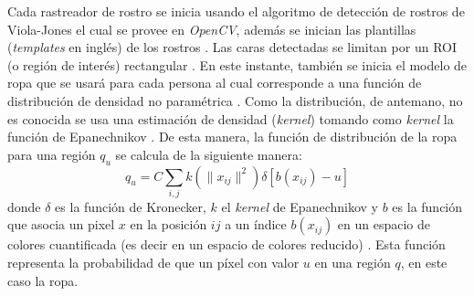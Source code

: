 \documentclass[a4paper,openright,12pt]{report}
\begin{document}
Cada rastreador de rostro se inicia usando el algoritmo de detección de rostros
de Viola-Jones el cual se provee en \textit{OpenCV}, además se inician las
plantillas (\textit{templates} en inglés) de los rostros \cite{shaik2007robust}. Las caras detectadas
se limitan por un ROI (o región de interés) rectangular \cite{shaik2007robust}.
En este instante, también se inicia el modelo
de ropa que se usará para cada persona al cual corresponde a una función de
distribución de densidad no paramétrica \cite{shaik2007robust}. Como la distribución, de antemano, no
es conocida se usa una estimación de densidad (\textit{kernel}) tomando como
\textit{kernel} la función de Epanechnikov \cite{shaik2007robust}. De esta manera, la función de
distribución de la ropa para una región $q_{u}$ se calcula de la siguiente
manera:
\[
    q_{u} = C{\sum_{i,j} k(\lVert x_{ij} \rVert^2)\delta[b(x_{ij}) - u]}
\]
donde $\delta$ es la función de Kronecker, $k$ el \textit{kernel} de
Epanechnikov y $b$ es la función que asocia un pixel $x$ en la posición $ij$
a un índice $b(x_{ij})$ en un espacio de colores cuantificada (es decir en un
espacio de colores reducido) \cite{shaik2007robust}. Esta función representa
la probabilidad de que un píxel con valor $u$ en una región $q$, en este caso
la ropa.\\
\end{document}
